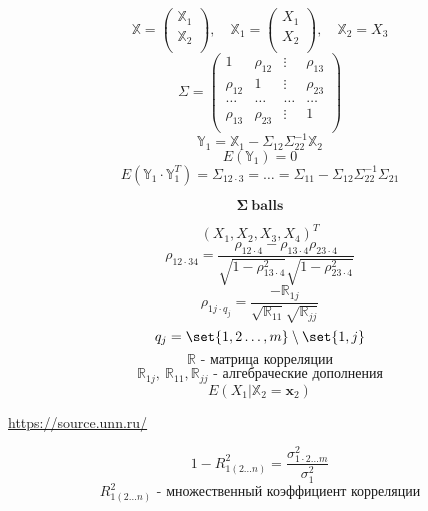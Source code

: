 \documentclass[a4paper]{article}
\DeclarePairedDelimiter\set\{\}
\theoremstyle{definition}
\theoremstyle{remark}
\begin{document}
\[
    \mathbb{X} = \begin{pmatrix}
    \mathbb{X}_1\\
    \mathbb{X}_2\\
    
    \end{pmatrix},
    \quad
    \mathbb{X}_1 = \begin{pmatrix}
    X_1\\
    X_2\\
    
    \end{pmatrix}, \quad \mathbb{X}_2 = X_3
\]
\[
    \Sigma = \begin{pmatrix}
    1 & \rho_{12} & \vdots & \rho_{13}\\
    \rho_{12} & 1 & \vdots & \rho_{23}\\
    \dots & \dots & \dots & \dots\\
    \rho_{13} & \rho_{23} & \vdots & 1\\
    
    \end{pmatrix}
\]
\[
    \mathbb{Y}_1 = \mathbb{X}_1 - \Sigma_{12}\Sigma_{22}^{-1} \mathbb{X}_2
\]
\[ 
    E(\mathbb{Y}_1) = 0
\]
\[
    E(\mathbb{Y}_1 \cdot \mathbb{Y}_1^T) = \Sigma_{12 \cdot 3} = \dots =
    \Sigma_{11} - \Sigma_{12}\Sigma_{22}^{-1}\Sigma_{21}
\]
\begin{tcolorbox}
    \[
        \mathbf{\Sigma \ balls}
    \]
\end{tcolorbox}
\[
    (X_1, X_2, X_3, X_4)^T
\]
\[
    \rho_{12 \cdot 34} = \frac{\rho_{12 \cdot 4} - \rho_{13 \cdot 4}\rho_{23 \cdot 4}}
    {\sqrt{1-\rho_{13 \cdot 4}^2} \sqrt{1 - \rho_{23 \cdot 4}^2}} 
\]
\[
    \rho_{1j \cdot q_j} = \frac{-\mathbb{R}_{1j}}{\sqrt{\mathbb{R}_{11}} \sqrt{\mathbb{R}_{jj}}} 
\]
\[
    q_j = \set{1, 2 \dots, m} \setminus \set{1, j}
\]
\[
    \mathbb{R} \text{ - матрица корреляции}
\]
\[
    \mathbb{R}_{1j}, \ \mathbb{R}_{11}, \mathbb{R}_{jj} \text{ - алгебраческие
    дополнения}
\]
\[
    E(X_1 | \mathbb{X}_2 = \mathbf{x}_2)
\]
\begin{tcolorbox}
    \begin{center}
        \url{https://source.unn.ru/}
    \end{center}
\end{tcolorbox}

\begin{tcolorbox}[title=Множественный коэффициент корреляции]
    \[
        1 - R_{1(2 \dots n)}^2 = \frac{\sigma_{1 \cdot 2 \dots m}^2}{\sigma_1^2} 
    \]
    \[
        R_{1(2 \dots n)}^2
        \text{ - множественный коэффициент корреляции}
    \]
\end{tcolorbox}
\end{document}
